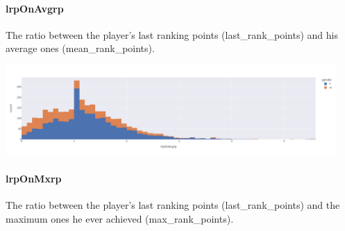 \documentclass{article}
\begin{document}
\paragraph{lrpOnAvgrp}
The ratio between the player's last ranking points (last\_rank\_points) and his average ones (mean\_rank\_points).
\begin{center}
	\includegraphics[height=130px]{plots/hists_feats_clustering/lrpOnAvrgrp_Hist.png}
	\label{fig:lrpOnAvrgrp_Hist}
	\label{fig1}
\end{center}

\paragraph{lrpOnMxrp}
The ratio between the player's last ranking points (last\_rank\_points) and the maximum ones he ever achieved (max\_rank\_points).

\end{document}
